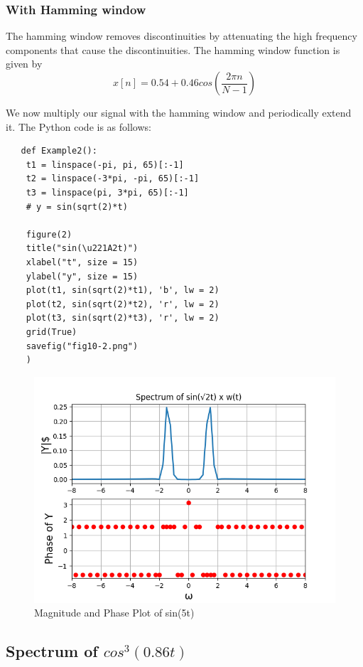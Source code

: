 \documentclass{article}
\begin{document}
\subsubsection{With Hamming window}
The hamming window removes discontinuities by attenuating the high frequency components that cause the discontinuities.
The hamming window function is given by
\begin{equation}
    x[n] = 0.54 + 0.46cos(\frac{2\pi n}{N-1})
\end{equation}

We now multiply our signal with the hamming window and periodically extend it.
\newline The Python code is as follows:
\begin{verbatim}
   def Example2():
    t1 = linspace(-pi, pi, 65)[:-1]
    t2 = linspace(-3*pi, -pi, 65)[:-1]
    t3 = linspace(pi, 3*pi, 65)[:-1]
    # y = sin(sqrt(2)*t)
    
    figure(2)
    title("sin(\u221A2t)")
    xlabel("t", size = 15)
    ylabel("y", size = 15)
    plot(t1, sin(sqrt(2)*t1), 'b', lw = 2)
    plot(t2, sin(sqrt(2)*t2), 'r', lw = 2)
    plot(t3, sin(sqrt(2)*t3), 'r', lw = 2)
    grid(True)
    savefig("fig10-2.png")
    )
\end{verbatim}

\begin{figure}[!ht]
  \centering
  \includegraphics[scale=0.6]{Figure_6.png}
  \caption{Magnitude and Phase Plot of sin(5t)}
  \label{fig:sample}
  \end{figure}
  
\newpage
\subsection{Spectrum of $cos^3(0.86t)$}
\end{document}
